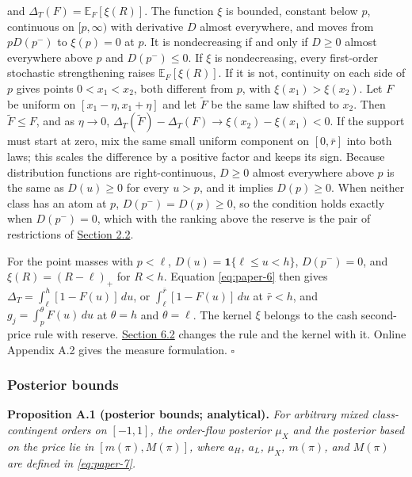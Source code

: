 and \(\Delta_T(F)=\mathbb E_F[\xi(R)]\). The function \(\xi\)
is bounded, constant below \(p\), continuous on \([p,\infty)\) with
derivative \(D\) almost everywhere, and moves from \(pD(p^-)\) to
\(\xi(p)=0\) at \(p\). It is nondecreasing if and only if
\(D\ge0\) almost everywhere above \(p\) and \(D(p^-)\le0\). If
\(\xi\) is nondecreasing, every first-order stochastic
strengthening raises \(\mathbb E_F[\xi(R)]\). If it is not,
continuity on each side of \(p\) gives points \(0<x_1<x_2\), both
different from \(p\), with \(\xi(x_1)>\xi(x_2)\). Let \(F\) be
uniform on \([x_1-\eta,x_1+\eta]\) and let \(\tilde F\) be the same law
shifted to \(x_2\). Then \(\tilde F\le F\), and as \(\eta\to0\),
\(\Delta_T(\tilde F)-\Delta_T(F)\to\xi(x_2)-\xi(x_1)<0\). If
the support must start at zero, mix the same small uniform component on
\([0,\bar r]\) into both laws; this scales the difference by a positive
factor and keeps its sign. Because distribution functions are
right-continuous, \(D\ge0\) almost everywhere above \(p\) is the same
as \(D(u)\ge0\) for every \(u>p\), and it implies \(D(p)\ge0\). When
neither class has an atom at \(p\), \(D(p^-)=D(p)\ge0\), so the
condition holds exactly when \(D(p^-)=0\), which with the ranking above
the reserve is the pair of restrictions of
\hyperref[sec-values-preparation-and-the-sale]{Section 2.2}.

For the point masses with \(p<\ell\), \(D(u)=\mathbf1\{\ell\le u<h\}\),
\(D(p^-)=0\), and \(\xi(R)=(R-\ell)_+\) for \(R<h\). Equation
\eqref{eq:paper-6} then gives \(\Delta_T=\int_\ell^h[1-F(u)]\,du\),
or \(\int_\ell^{\bar r}[1-F(u)]\,du\) at \(\bar r<h\), and
\(g_j=\int_p^\theta F(u)\,du\) at \(\theta=h\) and \(\theta=\ell\).
The kernel \(\xi\) belongs to the cash second-price rule with reserve.
\hyperref[sec-the-payment-rule]{Section 6.2} changes the rule and the
kernel with it. Online Appendix A.2 gives the measure formulation.
\(\square\)


\subsubsection{Posterior bounds}\label{posterior-bounds}

\protect{}\label{result-proposition-a-1}{\textbf{Proposition
A.1 (posterior bounds; analytical).}} \emph{For arbitrary mixed
class-contingent orders on \([-1,1]\), the order-flow posterior
\(\mu_X\) and the posterior based on the price lie in
\([m(\pi),M(\pi)]\), where \(a_H\), \(a_L\), \(\mu_X\), \(m(\pi)\), and
\(M(\pi)\) are defined in \eqref{eq:paper-7}.}

